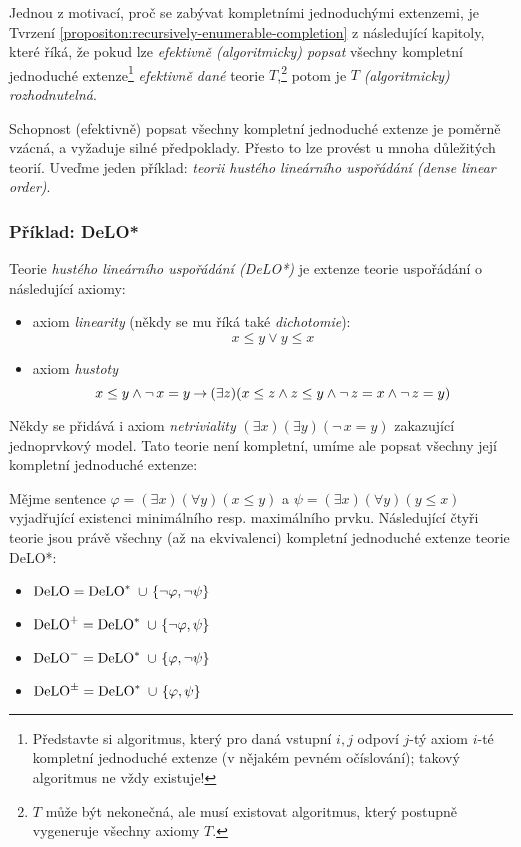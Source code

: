 \begin{remark}
    Jednou z motivací, proč se zabývat kompletními jednoduchými extenzemi, je Tvrzení \ref{propositon:recursively-enumerable-completion} z následující kapitoly, které říká, že pokud lze \emph{efektivně (algoritmicky) popsat} všechny kompletní jednoduché extenze\footnote{Představte si algoritmus, který pro daná vstupní $i,j$ odpoví $j$-tý axiom $i$-té kompletní jednoduché extenze (v nějakém pevném očíslování); takový algoritmus ne vždy existuje!} \emph{efektivně dané} teorie $T$,\footnote{$T$ může být nekonečná, ale musí existovat algoritmus, který postupně vygeneruje všechny axiomy $T$.} potom je $T$ \emph{(algoritmicky) rozhodnutelná}.
\end{remark}


Schopnost (efektivně) popsat všechny kompletní jednoduché extenze je poměrně vzácná, a vyžaduje silné předpoklady. Přesto to lze provést u mnoha důležitých teorií. Uveďme jeden příklad: \emph{teorii hustého lineárního uspořádání (dense linear order)}.

\subsubsection{Příklad: DeLO*}

Teorie \emph{hustého lineárního uspořádání (DeLO*)}  je extenze teorie uspořádání o následující axiomy:
\begin{itemize}
    \item axiom \emph{linearity} (někdy se mu říká také \emph{dichotomie}):
    $$
    x\leq y\lor y\leq x
    $$
    \item axiom \emph{hustoty}
    $$
    {x\leq y}\land{\neg\,x=y}\mathbin{\rightarrow}(\exists z)(x\leq z\land z\leq y\land\neg\,z=x\land\neg\,z=y)
    $$
\end{itemize}
Někdy se přidává i axiom \emph{netriviality} $(\exists x)(\exists y)(\neg\,x=y)$ zakazující jednoprvkový model. Tato teorie není kompletní, umíme ale popsat všechny její kompletní jednoduché extenze:

\begin{proposition}
Mějme sentence $\varphi=(\exists x)(\forall y)(x\leq y)$ a $\psi=(\exists x)(\forall y)(y\leq x)$ vyjadřující existenci minimálního resp. maximálního prvku. Následující čtyři teorie jsou právě všechny (až na ekvivalenci) kompletní jednoduché extenze teorie DeLO*:
\begin{itemize}
    \item $\operatorname{DeLO} = \operatorname{DeLO}^*\ \cup \ \{\neg\varphi
    ,\neg\psi\}$
    \item $\DeLO^+ = \DeLO^*\ \cup \ \{\neg\varphi
    ,\psi\}$
    \item $\operatorname{DeLO}^- = \operatorname{DeLO}^*\ \cup \ \{\varphi
    ,\neg\psi\}$
    \item $\operatorname{DeLO}^\pm = \operatorname{DeLO}^*\ \cup \ \{\varphi
    ,\psi\}$
\end{itemize}
\end{proposition}


